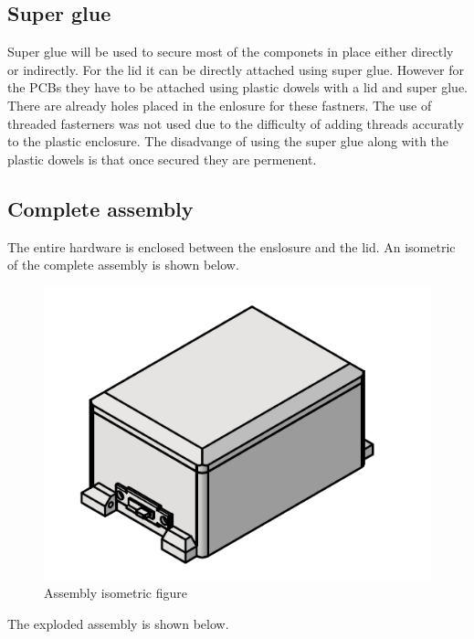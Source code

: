 \documentclass[12pt, titlepage]{article}
\begin{document}
\subsection{Super glue}
Super glue will be used to secure most of the componets in place either directly or indirectly. For the lid it can be directly attached using super glue. However for the PCBs they have to be attached using plastic dowels with a lid and super glue. There are already holes placed in the enlosure for these fastners. The use of threaded fasterners was not used due to the difficulty of adding threads accuratly to the plastic enclosure. The disadvange of using the super glue along with the plastic dowels is that once secured they are permenent.   

\subsection{Complete assembly}
The entire hardware is enclosed between the enslosure and the lid. An isometric of the complete assembly is shown below. \\
\begin{figure}[H]
  \vspace*{-1cm}
  \centering
  \includegraphics[width=\textwidth,height=\textheight/2,keepaspectratio]{Assembly_ISO.png}
  \caption{Assembly isometric figure}
  \label{Assembly ISO} 
\end{figure}
The exploded assembly is shown below. \\
\end{document}
